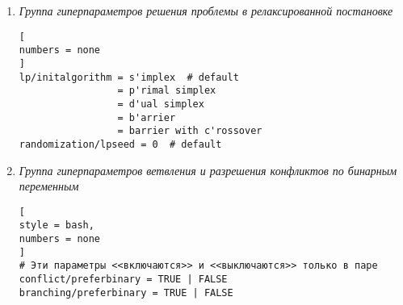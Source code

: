 \documentclass[%
	11pt,
	a4paper,
	utf8,
		]{article}
\begin{document}
\begin{enumerate}
    \item \emph{Группа гиперпараметров решения проблемы в релаксированной постановке}
\begin{lstlisting}[
numbers = none
]
lp/initalgorithm = s'implex  # default
                 = p'rimal simplex
                 = d'ual simplex
                 = b'arrier
                 = barrier with c'rossover
randomization/lpseed = 0  # default
\end{lstlisting}

    \item \emph{Группа гиперпараметров ветвления и разрешения конфликтов по бинарным переменным}
\begin{lstlisting}[
style = bash,
numbers = none
]
# Эти параметры <<включаются>> и <<выключаются>> только в паре
conflict/preferbinary = TRUE | FALSE
branching/preferbinary = TRUE | FALSE
\end{lstlisting}


\end{enumerate}
\end{document}
